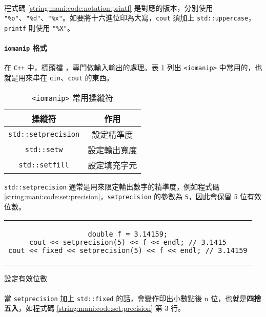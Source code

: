 \documentclass[12pt,a4paper,oneside]{report}
\begin{document}
\begin{CJK}{UTF8}{bkai}
\paragraph{}程式碼 \ref{string:mani:code:notation:printf} 是對應的版本，分別使用 \lstinline!"%o"!、\lstinline!"%d"!、\lstinline!"%x"!。如要將十六進位印為大寫，\lstinline!cout! 須加上 \lstinline!std::uppercase!，\lstinline!printf! 則使用 \lstinline!"%X"!。
\paragraph{\texttt{iomanip} 格式}在 \texttt{C++} 中，標頭檔 ，專門做輸入輸出的處理。表 \ref{string:mani:table:iomanip} 列出 \lstinline!<iomanip>!
中常用的，也就是用來串在 \lstinline!cin!、\lstinline!cout! 的東西。

\begin{table}[h!]
  \centering
  \begin{tabular}{|c|c|}
  \hline
  \textbf{操縱符} & \textbf{作用}\\
  \hline\hline
  \lstinline!std::setprecision! & 設定精準度\\
  \hline
  \lstinline!std::setw! & 設定輸出寬度\\
  \hline
  \lstinline!std::setfill! & 設定填充字元\\
  \hline
  \end{tabular}
  \caption{\lstinline!<iomanip>! 常用操縱符}
  \label{string:mani:table:iomanip}
\end{table}

\lstinline!std::setprecision! 通常是用來限定輸出數字的精準度，例如程式碼 \ref{string:mani:code:set:precision}，\lstinline!setprecision! 的參數為 \lstinline!5!，因此會保留 5 位有效位數。

\begin{code}[h!]
  \centering
  \begin{tabular}{c}
  \begin{lstlisting}
double f = 3.14159;
cout << setprecision(5) << f << endl; // 3.1415
cout << fixed << setprecision(5) << f << endl; // 3.14159
  \end{lstlisting}
  \end{tabular}
  \caption{設定有效位數}
  \label{string:mani:code:set:precision}
\end{code}

\paragraph{}當 \lstinline!setprecision! 加上 \lstinline!std::fixed! 的話，會變作印出小數點後 n 位，也就是\textbf{四捨五入}，如程式碼 \ref{string:mani:code:set:precision} 第 3 行。

\end{CJK}
\end{document}
